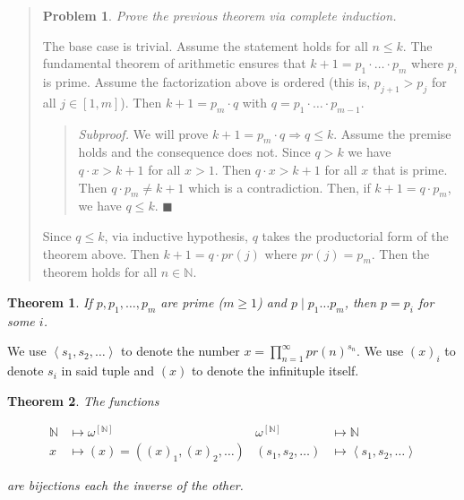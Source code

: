 \documentclass[a4paper, 12pt]{article}
\newtheorem{problem}{Problem}
\newtheorem{theorem}{Theorem}
\newtheorem{problem}{Problem}
\newtheorem{theorem}{Theorem}
\begin{document}
\small
\begin{quote}

\begin{problem}
    Prove the previous theorem via complete induction.
\end{problem}

The base case is trivial. Assume the statement holds for all $n \leq k$. The
fundamental theorem of arithmetic ensures that $k + 1 = p_1 \cdot \ldots \cdot
p_m$ where $p_i$ is prime. Assume the factorization above is ordered (this is,
$p_{j + 1} > p_j$ for all $j \in [1, m]$). Then $k + 1 = p_m \cdot q$ with $q =
p_1 \cdot \ldots \cdot p_{m - 1}$. 

\footnotesize
\begin{quote}
    \textit{Subproof.} We will prove $k + 1 = p_m \cdot q \Rightarrow q \leq k$.
    Assume the premise holds and the consequence does not. Since $q > k$ we have
    $q \cdot x > k + 1$ for all $x > 1$. Then $q \cdot x > k + 1$ for all $x$
    that is prime. Then $q \cdot p_m \neq k + 1$ which is a contradiction. Then,
    if $k + 1 = q \cdot p_m$, we have $q \leq k$. $\blacksquare$
\end{quote}
\small

Since $q \leq k$, via inductive hypothesis, $q$ takes the productorial form of
the theorem above. Then $k + 1 = q \cdot pr(j)$ where $pr(j) = p_m$. Then the
theorem holds for all $n \in \mathbb{N}$.

\end{quote}
\normalsize


\begin{theorem}
    If $p, p_1, \ldots, p_m$ are prime ($m \geq 1$) and $p \mid p_1 \ldots p_m$,
    then $p = p_i$ for some $i$.
\end{theorem}

We use $\left\langle  s_1, s_2, \ldots  \right\rangle$ to denote the number $x =
\prod_{n=1}^{\infty} pr(n)^{s_n}$. We use $(x)_i$ to denote $s_i$ in said tuple
and $(x)$ to denote the infinituple itself.

\begin{theorem}
    The functions 

    \begin{align*}
        \mathbb{N} &\mapsto \omega^{[\mathbb{N}]} &
        \omega^{[\mathbb{N}]}&\mapsto \mathbb{N} \\  
        x &\mapsto (x) = \left( (x)_1, (x)_2, \ldots \right) & (s_1, s_2,
        \ldots)&\mapsto \left\langle  s_1, s_2,\ldots  \right\rangle
    \end{align*}

    are bijections each the inverse of the other.
\end{theorem}
\end{document}
